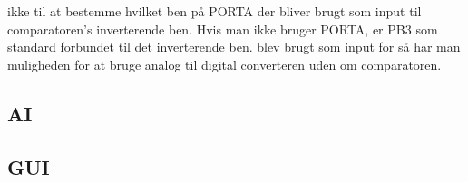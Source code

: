 ikke til at bestemme hvilket ben på PORTA der bliver brugt som input til comparatoren's inverterende ben.  Hvis man ikke bruger PORTA, er PB3 som standard forbundet til det inverterende ben. blev brugt som input for så har man muligheden for at bruge analog til digital converteren uden om comparatoren. 

\subsection{AI}

\subsection{GUI}
